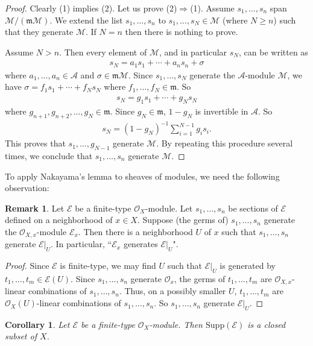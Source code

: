 \documentclass[12pt,b5paper,notitlepage]{report}
\theoremstyle{definition}
\newtheorem{rem}[df]{Remark}
\theoremstyle{plain}
\newtheorem{co}[df]{Corollary}
\newcommand{\mc}{\mathcal}
\newcommand{\scr}{\mathscr}
\newcommand{\Supp}{\mathrm{Supp}}
\newcommand{\mk}{\mathfrak m}
\numberwithin{equation}{section}
\begin{document}
\begin{proof}
Clearly (1) implies (2). Let us prove (2)$\Rightarrow$(1).  Assume $s_1,\dots,s_n$ span $\mc M/(\mk\mc M)$. We extend the list $s_1,\dots,s_n$ to $s_1,\dots,s_N\in\mc M$ (where $N\geq n$) such that they generate $\mc M$. If $N=n$ then there is nothing to prove.

Assume $N>n$. Then every element of $\mc M$, and in particular $s_N$,  can be written as
\begin{align*}
s_N=a_1s_1+\cdots+a_ns_n+\sigma
\end{align*}
where $a_1,\dots,a_n\in\mc A$ and $\sigma\in\mk\mc M$. Since $s_1,\dots,s_N$ generate the $\mc A$-module $\mc M$, we have $\sigma=f_1s_1+\cdots+f_Ns_N$ where $f_1,\dots,f_N\in\mk$. So
\begin{align*}
s_N=g_1s_1+\cdots+g_Ns_N
\end{align*}
where $g_{n+1},g_{n+2},\dots,g_N\in\mk$. Since $g_N\in\mk$, $1-g_N$ is invertible in $\mc A$. So
\begin{align*}
s_N=(1-g_N)^{-1}\sum_{i=1}^{N-1}g_is_i.
\end{align*}
This proves that $s_1,\dots,g_{N-1}$ generate $\mc M$. By repeating this procedure several times, we conclude that $s_1,\dots,s_n$ generate $\mc M$.
\end{proof}


To apply Nakayama's lemma to sheaves of modules, we need the following observation:
\begin{rem}\label{lb17}
Let $\scr E$ be a finite-type $\scr O_X$-module. Let $s_1,\dots,s_n$ be sections of $\scr E$ defined on a neighborhood of $x\in X$. Suppose (the germs of) $s_1,\dots,s_n$ generate the $\scr O_{X,x}$-module $\scr E_x$. Then there is a neighborhood $U$ of $x$ such that $s_1,\dots,s_n$ generate $\scr E|_U$. In particular, ``$\scr E_x$ generates $\scr E|_U$".
\end{rem}


\begin{proof}
Since $\scr E$ is finite-type, we may find $U$ such that $\scr E|_U$ is generated by $t_1,\dots,t_m\in\scr E(U)$. Since $s_1,\dots,s_n$ generate $\scr O_x$, the germs of $t_1,\dots,t_m$ are $\scr O_{X,x}$-linear combinations of $s_1,\dots,s_n$. Thus, on a possibly smaller $U$, $t_1,\dots,t_m$ are $\scr O_X(U)$-linear combinations of $s_1,\dots,s_n$. So $s_1,\dots,s_n$ generate $\scr E|_U$.
\end{proof}


\begin{co}\label{lb43}
Let $\scr E$ be a finite-type $\scr O_X$-module. Then $\Supp(\scr E)$ is a closed subset of $X$.
\end{co}
\end{document}
